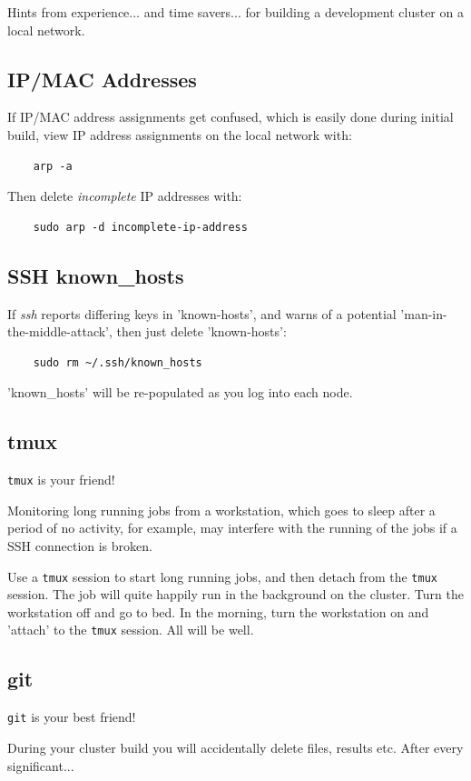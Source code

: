 \documentclass{article}
\begin{document}
Hints from experience... and time savers... for building a development cluster on a local network.

\subsection{IP/MAC Addresses}
If IP/MAC address assignments get confused, which is easily done during initial build, view IP address assignments on the local network with:

\begin{verbatim}
    arp -a
\end{verbatim}

Then delete \emph{incomplete} IP addresses with:

\begin{verbatim}
    sudo arp -d incomplete-ip-address
\end{verbatim}

\subsection{SSH known\_hosts}
If \emph{ssh} reports differing keys in 'known-hosts', and warns of a potential 'man-in-the-middle-attack', then just delete 'known-hosts':

\begin{verbatim}
    sudo rm ~/.ssh/known_hosts
\end{verbatim}

'known\_hosts' will be re-populated as you log into each node. 


\subsection{tmux}
\verb|tmux| is your friend!

Monitoring long running jobs from a workstation, which goes to sleep after a period of no activity, for example, may interfere with the running of the jobs if a SSH connection is broken.

Use a \verb|tmux| session to start long running jobs, and then detach from the \verb|tmux| session. The job will quite happily run in the background on the cluster. Turn the workstation off and go to bed. In the morning, turn the workstation on and 'attach' to the \verb|tmux| session. All will be well.

\subsection{git}
\verb|git| is your best friend!

During your cluster build you will accidentally delete files, results etc. After every significant...
\end{document}
